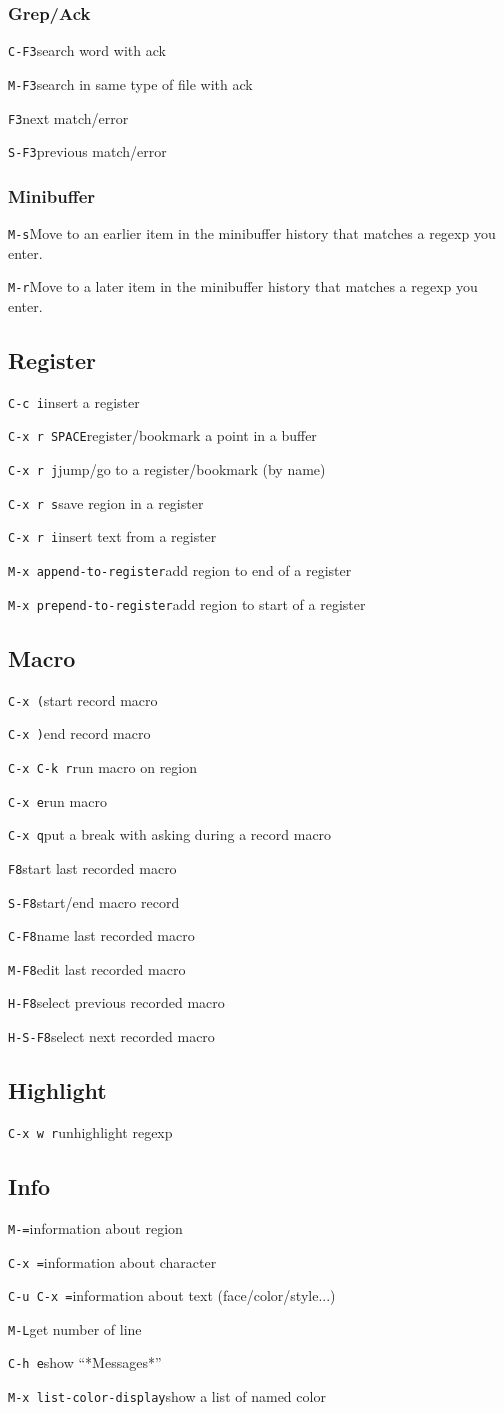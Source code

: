 \documentclass[10pt,landscape]{article}
\def\cm#1#2{{\tt#1}\dotfill#2\par}
\begin{document}
\begin{multicols}{3}
\subsubsection{Grep/Ack}
\cm{C-F3}{search word with ack}
\cm{M-F3}{search in same type of file with ack}
\cm{F3}{next match/error}
\cm{S-F3}{previous match/error}

\subsubsection{Minibuffer}
\cm{M-s}{Move to an earlier item in the minibuffer history that matches a regexp you enter.}
\cm{M-r}{Move to a later item in the minibuffer history that matches a regexp you enter.}

\subsection{Register}
\cm{C-c i}{insert a register}
\cm{C-x r SPACE}{register/bookmark a point in a buffer}
\cm{C-x r j}{jump/go to a register/bookmark (by name)}
\cm{C-x r s}{save region in a register}
\cm{C-x r i}{insert text from a register}
\cm{M-x append-to-register}{add region to end of a register}
\cm{M-x prepend-to-register}{add region to start of a register}

\subsection{Macro}
\cm{C-x (}{start record macro}
\cm{C-x )}{end record macro}
\cm{C-x C-k r}{run macro on region}
\cm{C-x e}{run macro}
\cm{C-x q}{put a break with asking during a record macro}
\cm{F8}{start last recorded macro}
\cm{S-F8}{start/end macro record}
\cm{C-F8}{name last recorded macro}
\cm{M-F8}{edit last recorded macro}
\cm{H-F8}{select previous recorded macro}
\cm{H-S-F8}{select next recorded macro}

\subsection{Highlight}
\cm{C-x w r}{unhighlight regexp}

\subsection{Info}
\cm{M-=}{information about region}
\cm{C-x =}{information about character}
\cm{C-u C-x =}{information about text (face/color/style...)}
\cm{M-L}{get number of line}
\cm{C-h e}{show ``*Messages*''}
\cm{M-x list-color-display}{show a list of named color}


\end{multicols}
\end{document}
